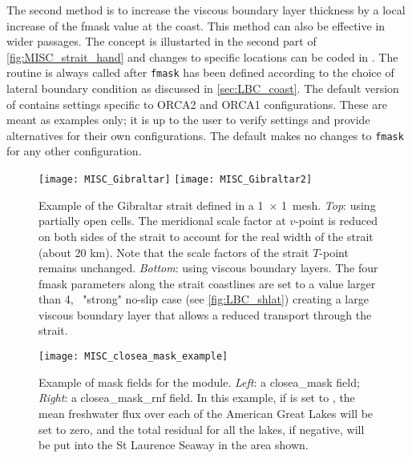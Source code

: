 \documentclass[../main/NEMO_manual]{subfiles}
\begin{document}
The second method is to increase the viscous boundary layer thickness by a local increase
of the fmask value at the coast. This method can also be effective in wider passages.  The
concept is illustarted in the second part of  \autoref{fig:MISC_strait_hand} and changes
to specific locations can be coded in . The 
routine is always called after \texttt{fmask} has been defined according to the choice of
lateral boundary condition as discussed in \autoref{sec:LBC_coast}. The default version of
 contains settings specific to ORCA2 and ORCA1 configurations. These are
meant as examples only; it is up to the user to verify settings and provide alternatives
for their own configurations. The default  makes no changes to
\texttt{fmask} for any other configuration.

\begin{figure}[!tbp]
  \centering
  \texttt{[image: MISC\_Gibraltar]}
  \texttt{[image: MISC\_Gibraltar2]}
  \caption[Two methods to defined the Gibraltar strait]{
    Example of the Gibraltar strait defined in a 1\deg\ $\times$ 1\deg\ mesh.
    \textit{Top}: using partially open cells.
    The meridional scale factor at $v$-point is reduced on both sides of the strait to
    account for the real width of the strait (about 20 km).
    Note that the scale factors of the strait $T$-point remains unchanged.
    \textit{Bottom}: using viscous boundary layers.
    The four fmask parameters along the strait coastlines are set to a value larger than 4,
    \ie\ "strong" no-slip case (see \autoref{fig:LBC_shlat}) creating a large viscous boundary layer
    that allows a reduced transport through the strait.}
  \label{fig:MISC_strait_hand}
\end{figure}

\begin{figure}[!tbp]
  \centering
  \texttt{[image: MISC\_closea\_mask\_example]}
  \caption[Mask fields for the \protect{} module]{
    Example of mask fields for the \protect{} module.
    \textit{Left}: a closea\_mask field;
    \textit{Right}: a closea\_mask\_rnf field.
    In this example, if \protect{} is set to ,
    the mean freshwater flux over each of the American Great Lakes will be set to zero,
    and the total residual for all the lakes, if negative, will be put into
    the St Laurence Seaway in the area shown.}
  \label{fig:MISC_closea_mask_example}
\end{figure}
\end{document}
